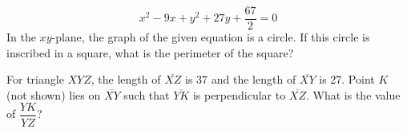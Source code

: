 \vfill
\clearpage
\noindent\begin{minipage}{\linewidth}
\par\smallskip
$$x^2-9x+y^2+27y+\frac{67}{2}=0$$ In the $xy$-plane, the graph of the given equation is a circle. If this circle is inscribed in a square, what is the perimeter of the square?
\end{minipage}
\vfill
\noindent\begin{minipage}{\linewidth}
\par\smallskip
For triangle $XYZ$, the length of $\overline{XZ}$ is 37 and the length of $\overline{XY}$ is 27. Point $K$ (not shown) lies on $\overline{XY}$ such that $\overline{YK}$ is perpendicular to $\overline{XZ}$. What is the value of $\dfrac{YK}{YZ}$?
\satfig{\figrighttrixyz}
\satnotetoscale
\end{minipage}
\vfill
\clearpage

